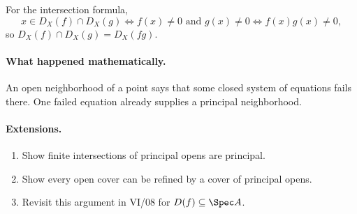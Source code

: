 For the intersection formula,
\[
x\in D_X(f)\cap D_X(g)
\iff f(x)\neq0\text{ and }g(x)\neq0
\iff f(x)g(x)\neq0,
\]
so \(D_X(f)\cap D_X(g)=D_X(fg)\).

\paragraph{What happened mathematically.}
An open neighborhood of a point says that some closed system of equations fails there.
One failed equation already supplies a principal neighborhood.

\paragraph{Extensions.}
\begin{enumerate}
\item Show finite intersections of principal opens are principal.
\item Show every open cover can be refined by a cover of principal opens.
\item Revisit this argument in VI/08 for \(D(f)\subseteq\Spec A\).
\end{enumerate}
\fi
